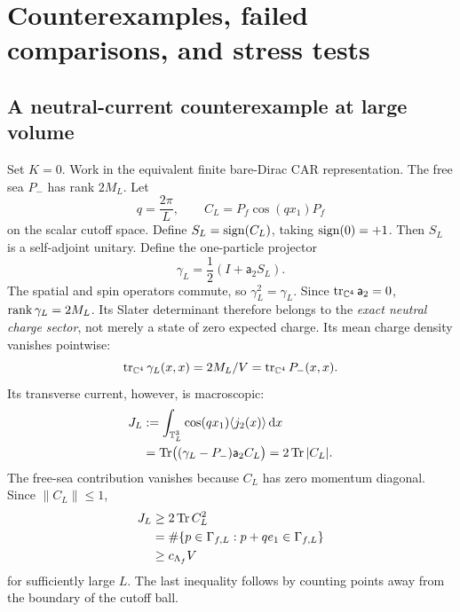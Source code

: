 \section{Counterexamples, failed comparisons, and stress tests}
\label{sec:counterexamples}

\subsection{A neutral-current counterexample at large volume}
Set \(K=0\). Work in the equivalent finite bare-Dirac CAR representation.
The free sea \(P_-\) has rank \(2M_L\).
Let
\begin{equation}
q=\frac{2\pi}{L},\qquad C_L=P_f\cos(qx_1)P_f
\end{equation}
on the scalar cutoff space. Define \(S_L=\operatorname{sign}(C_L)\), taking
\(\operatorname{sign}(0)=+1\). Then \(S_L\) is a self-adjoint unitary.
Define the one-particle projector
\begin{equation}
\gamma_L=\frac12\left(I+\mathsf a_2S_L\right).
\label{eq:trial-projector}
\end{equation}
The spatial and spin operators commute, so \(\gamma_L^2=\gamma_L\).
Since \(\operatorname{tr}_{\mathbb C^4}\mathsf a_2=0\), \(\operatorname{rank}\gamma_L=2M_L\).
Its Slater determinant therefore belongs to the \emph{exact neutral charge
sector}, not merely a state of zero expected charge.
Its mean charge density vanishes pointwise:
\begin{equation}
\operatorname{tr}_{\mathbb C^4}\gamma_L(x,x)=2M_L/V
=\operatorname{tr}_{\mathbb C^4}P_-(x,x).
\label{eq:trial-charge}
\end{equation}
Its transverse current, however, is macroscopic:
\begin{align}
J_L&:=\int_{\mathbb T_L^3}\cos(qx_1)\langle j_2(x)\rangle\,\mathrm d x
\nonumber\\
&=\operatorname{Tr}\bigl((\gamma_L-P_-)\mathsf a_2C_L\bigr)
=2\operatorname{Tr}|C_L|.
\label{eq:trial-current}
\end{align}
The free-sea contribution vanishes because \(C_L\) has zero momentum
diagonal. Since \(\|C_L\|\le1\),
\begin{align}
J_L&\ge2\operatorname{Tr} C_L^2
\nonumber\\
&=\#\{p\in\Gamma_{f,L}:p+qe_1\in\Gamma_{f,L}\}
\nonumber\\
&\ge c_{\Lambda_f}V
\label{eq:trial-current-size}
\end{align}
for sufficiently large \(L\). The last inequality follows by counting
points away from the boundary of the cutoff ball.


